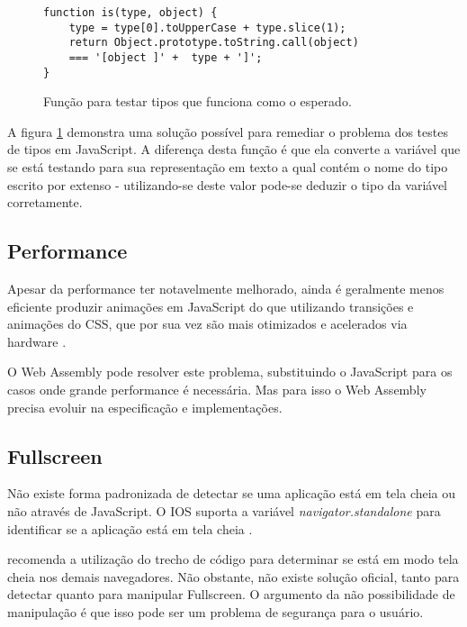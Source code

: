 \begin{figure}[H]
\centering
\begin{verbatim}
function is(type, object) {
    type = type[0].toUpperCase + type.slice(1);
    return Object.prototype.toString.call(object)
    === '[object ]' +  type + ']';
}
\end{verbatim}
\caption{Função para testar tipos que funciona como o esperado.}
\label{fig:fixJSTypes}
\end{figure}

A figura \ref{fig:fixJSTypes} demonstra uma solução possível para
remediar o problema dos testes de tipos em JavaScript. A diferença
desta função é que ela converte a variável que se está testando
para sua representação em texto a qual contém o nome do tipo escrito
por extenso - utilizando-se deste valor pode-se deduzir o tipo da
variável corretamente.

\subsection{Performance}

Apesar da performance ter notavelmente melhorado, ainda é geralmente
menos eficiente produzir animações em JavaScript do que utilizando
transições e animações do CSS, que por sua vez são mais otimizados
e acelerados via hardware \autocite{html5mostwanted} .

O Web Assembly pode resolver este problema, substituindo o JavaScript
para os casos onde grande performance é necessária. Mas para isso o
Web Assembly precisa evoluir na especificação e implementações.

\subsection{Fullscreen}

Não existe forma padronizada de detectar se uma aplicação está
em tela cheia ou não através de JavaScript. O IOS suporta a
variável \textit{navigator.standalone } para identificar se a
aplicação está em tela cheia .

\citet{homescreenwebapps} recomenda a utilização do trecho de código
para determinar se está em modo tela cheia nos demais navegadores. Não
obstante, não existe solução oficial, tanto para detectar quanto para
manipular Fullscreen. O argumento da não possibilidade de manipulação
é que isso pode ser um problema de segurança para o usuário.

